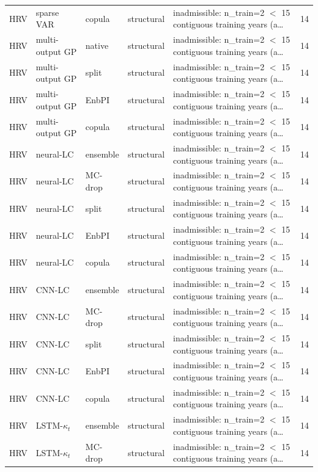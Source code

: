 {\begin{longtable}{@{}lllp{1.6cm}p{6.2cm}r@{}}
HRV & sparse VAR & copula & structural & inadmissible: n\_train=2 $<$ 15 contiguous training years (a\ldots & 14 \\
HRV & multi-output GP & native & structural & inadmissible: n\_train=2 $<$ 15 contiguous training years (a\ldots & 14 \\
HRV & multi-output GP & split & structural & inadmissible: n\_train=2 $<$ 15 contiguous training years (a\ldots & 14 \\
HRV & multi-output GP & EnbPI & structural & inadmissible: n\_train=2 $<$ 15 contiguous training years (a\ldots & 14 \\
HRV & multi-output GP & copula & structural & inadmissible: n\_train=2 $<$ 15 contiguous training years (a\ldots & 14 \\
HRV & neural-LC & ensemble & structural & inadmissible: n\_train=2 $<$ 15 contiguous training years (a\ldots & 14 \\
HRV & neural-LC & MC-drop & structural & inadmissible: n\_train=2 $<$ 15 contiguous training years (a\ldots & 14 \\
HRV & neural-LC & split & structural & inadmissible: n\_train=2 $<$ 15 contiguous training years (a\ldots & 14 \\
HRV & neural-LC & EnbPI & structural & inadmissible: n\_train=2 $<$ 15 contiguous training years (a\ldots & 14 \\
HRV & neural-LC & copula & structural & inadmissible: n\_train=2 $<$ 15 contiguous training years (a\ldots & 14 \\
HRV & CNN-LC & ensemble & structural & inadmissible: n\_train=2 $<$ 15 contiguous training years (a\ldots & 14 \\
HRV & CNN-LC & MC-drop & structural & inadmissible: n\_train=2 $<$ 15 contiguous training years (a\ldots & 14 \\
HRV & CNN-LC & split & structural & inadmissible: n\_train=2 $<$ 15 contiguous training years (a\ldots & 14 \\
HRV & CNN-LC & EnbPI & structural & inadmissible: n\_train=2 $<$ 15 contiguous training years (a\ldots & 14 \\
HRV & CNN-LC & copula & structural & inadmissible: n\_train=2 $<$ 15 contiguous training years (a\ldots & 14 \\
HRV & LSTM-$\kappa_t$ & ensemble & structural & inadmissible: n\_train=2 $<$ 15 contiguous training years (a\ldots & 14 \\
HRV & LSTM-$\kappa_t$ & MC-drop & structural & inadmissible: n\_train=2 $<$ 15 contiguous training years (a\ldots & 14 \\

\end{longtable}}
